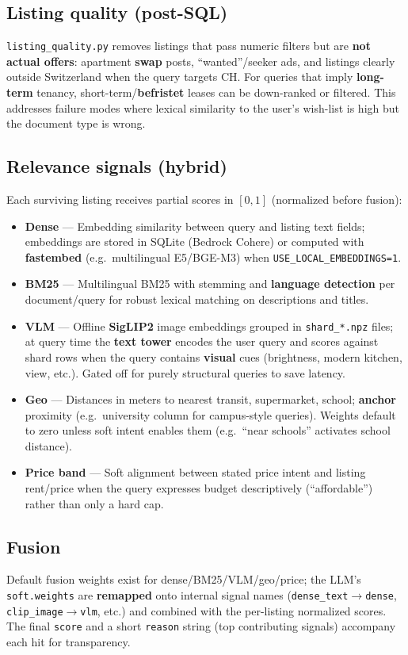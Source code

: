 \documentclass[11pt]{article}
\begin{document}
\subsection{Listing quality (post-SQL)}
\texttt{listing\_quality.py} removes listings that pass numeric filters but are \textbf{not actual offers}: apartment \textbf{swap} posts, ``wanted''/seeker ads, and listings clearly outside Switzerland when the query targets CH. For queries that imply \textbf{long-term} tenancy, short-term/\textbf{befristet} leases can be down-ranked or filtered. This addresses failure modes where lexical similarity to the user's wish-list is high but the document type is wrong.

\subsection{Relevance signals (hybrid)}
Each surviving listing receives partial scores in $[0,1]$ (normalized before fusion):
\begin{itemize}[noitemsep, topsep=0pt]
  \item \textbf{Dense} --- Embedding similarity between query and listing text fields; embeddings are stored in SQLite (Bedrock Cohere) or computed with \textbf{fastembed} (e.g.\ multilingual E5/BGE-M3) when \texttt{USE\_LOCAL\_EMBEDDINGS=1}.
  \item \textbf{BM25} --- Multilingual BM25 with stemming and \textbf{language detection} per document/query for robust lexical matching on descriptions and titles.
  \item \textbf{VLM} --- Offline \textbf{SigLIP2} image embeddings grouped in \texttt{shard\_*.npz} files; at query time the \textbf{text tower} encodes the user query and scores against shard rows when the query contains \textbf{visual} cues (brightness, modern kitchen, view, etc.). Gated off for purely structural queries to save latency.
  \item \textbf{Geo} --- Distances in meters to nearest transit, supermarket, school; \textbf{anchor} proximity (e.g.\ university column for campus-style queries). Weights default to zero unless soft intent enables them (e.g.\ ``near schools'' activates school distance).
  \item \textbf{Price band} --- Soft alignment between stated price intent and listing rent/price when the query expresses budget descriptively (``affordable'') rather than only a hard cap.
\end{itemize}

\subsection{Fusion}
Default fusion weights exist for dense/BM25/VLM/geo/price; the LLM's \texttt{soft.weights} are \textbf{remapped} onto internal signal names (\texttt{dense\_text}$\rightarrow$\texttt{dense}, \texttt{clip\_image}$\rightarrow$\texttt{vlm}, etc.) and combined with the per-listing normalized scores. The final \texttt{score} and a short \texttt{reason} string (top contributing signals) accompany each hit for transparency.
\end{document}
